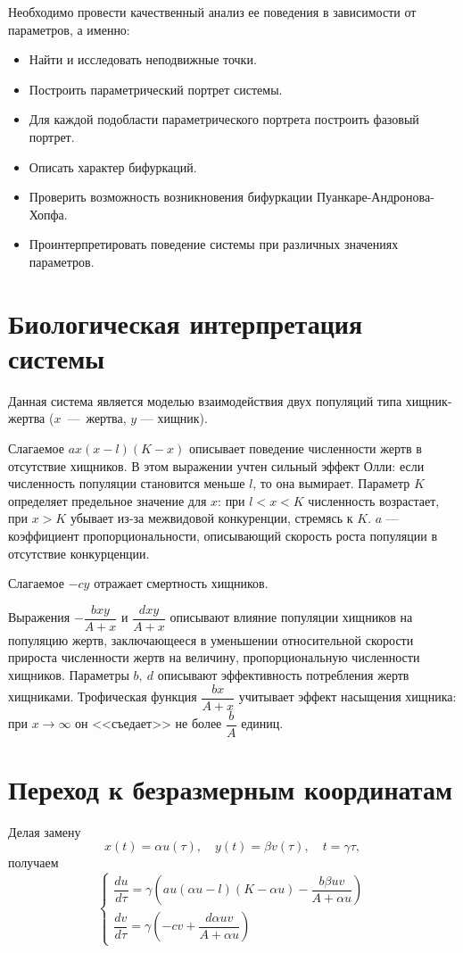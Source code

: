 \documentclass[16pt]{article}
\begin{document}
Необходимо провести качественный анализ ее поведения в зависимости от параметров, а именно:
\begin{itemize}
\item Найти и исследовать неподвижные точки.
\item Построить параметрический портрет системы.
\item Для каждой подобласти параметрического портрета построить фазовый портрет.
\item Описать характер бифуркаций.
\item Проверить возможность возникновения бифуркации Пуанкаре-Андронова-Хопфа.
\item Проинтерпретировать поведение системы при различных значениях параметров.
\end{itemize}

\section{Биологическая интерпретация системы}
Данная система является моделью взаимодействия двух популяций типа хищник-жертва ($x$~---~жертва,
$y$ --- хищник).

 Слагаемое $ax(x-l)(K-x)$ описывает поведение численности жертв в отсутствие хищников.
В этом выражении учтен сильный эффект Олли: если численность популяции становится меньше $l$, то она вымирает.
Параметр $K$ определяет предельное значение для $x$: при $l < x < K$ численность возрастает, при $x > K$
убывает из-за межвидовой конкуренции, стремясь к $K$. $a$ --- коэффициент пропорциональности, описывающий
скорость роста популяции в отсутствие конкурценции.

Слагаемое $-cy$ отражает смертность хищников.

Выражения $-\dfrac{bxy}{A+x}$ и $\dfrac{dxy}{A + x}$ описывают влияние популяции хищников на популяцию
жертв, заключающееся в уменьшении относительной скорости прироста численности жертв на величину,
пропорциональную численности хищников. Параметры $b, \ d$ описывают эффективность потребления жертв
хищниками. Трофическая функция $\dfrac{bx}{A + x}$ учитывает эффект насыщения хищника: при $x \to \infty$ 
он <<съедает>> не более $\dfrac{b}{A}$ единиц. 


\section{Переход к безразмерным координатам}
Делая замену
$$x(t) = \alpha u(\tau), \quad y(t) = \beta v(\tau), \quad t = \gamma \tau,$$
получаем
$$
\begin{cases}
\dfrac{du}{d\tau} = \gamma\left(au(\alpha u - l)(K - \alpha u) - \dfrac{b\beta uv}{A + \alpha u}\right)\\
\dfrac{dv}{d\tau} = \gamma\left(-cv + \dfrac{d \alpha u v}{A + \alpha u}\right)
\end{cases}
$$
\end{document}
